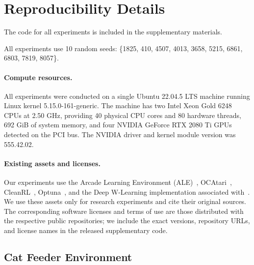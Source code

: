 \section{Reproducibility Details}
\label{sec:reprod-details}

The code for all experiments is included in the supplementary materials.

All experiments use 10 random seeds: \{1825, 410, 4507, 4013, 3658, 5215, 6861, 6803, 7819, 8057\}.

\paragraph{Compute resources.}
All experiments were conducted on a single Ubuntu 22.04.5 LTS machine running Linux kernel 5.15.0-161-generic. The machine has two Intel Xeon Gold 6248 CPUs at 2.50 GHz, providing 40 physical CPU cores and 80 hardware threads, 692 GiB of system memory, and four NVIDIA GeForce RTX 2080 Ti GPUs detected on the PCI bus. The NVIDIA driver and kernel module version was 555.42.02.

\paragraph{Existing assets and licenses.}
Our experiments use the Arcade Learning Environment (ALE)~\cite{bellemare13arcade}, OCAtari~\cite{delfosse2023ocatari}, CleanRL~\cite{huang2022cleanrl}, Optuna~\cite{akiba2019optuna}, and the Deep W-Learning implementation associated with~\cite{rosero2024multi}. We use these assets only for research experiments and cite their original sources. The corresponding software licenses and terms of use are those distributed with the respective public repositories; we include the exact versions, repository URLs, and license names in the released supplementary code.

\subsection{Cat Feeder Environment}

